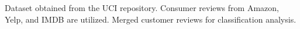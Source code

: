 Dataset obtained from the UCI repository. Consumer reviews from Amazon, Yelp, and IMDB are utilized. Merged customer reviews for classification analysis.